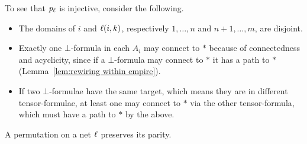 \documentclass[conference]{IEEEtran}
\begin{document}
To see that $\mathit p_{\ell}$ is injective, consider the following.
\begin{itemize}
	\item The domains of $i$ and $\ell(i,k)$, respectively $1,\dotsc,n$ and $n+1,\dotsc,m$, are disjoint.
	\item Exactly one $\bot$-formula in each $A_i$ may connect to $*$ because of connectedness and acyclicity, since if a $\bot$-formula may connect to $*$ it has a path to $*$ (Lemma~\ref{lem:rewiring within empire}).
	\item If two $\bot$-formulae have the same target, which means they are in different tensor-formulae, at least one may connect to $*$ via the other tensor-formula, which must have a path to $*$ by the above.
\end{itemize}



\begin{proposition}
\label{prop:level0 min binary}
A permutation on a net $\ell$ preserves its parity. 
\end{proposition}
\end{document}
